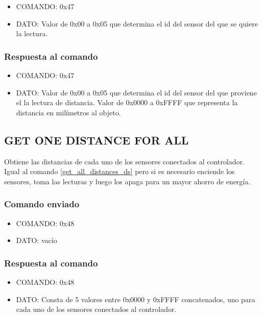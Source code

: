 \documentclass[a4paper,10pt]{article}
\begin{document}
\begin{itemize}
	\item{COMANDO:} 0x47
	\item{DATO:} Valor de 0x00 a 0x05 que determina el id del sensor del que se quiere la lectura.
\end{itemize}

\subsubsection*{Respuesta al comando}

\begin{itemize}
	\item{COMANDO:} 0x47
	\item{DATO:} Valor de 0x00 a 0x05 que determina el id del sensor del que proviene el la lectura de distancia.
	Valor de 0x0000 a 0xFFFF que representa la distancia en mil\'imetros al objeto.
\end{itemize}

\subsection{GET ONE DISTANCE FOR ALL}
\label{get_one_distance_for_all_ds}

Obtiene las distancias de cada uno de los sensores conectados al controlador.
Igual al comando \ref{get_all_distances_ds} pero si es necesario enciende los sensores, toma las lecturas y luego los apaga para un mayor ahorro de energ\'ia.

\subsubsection*{Comando enviado}

\begin{itemize}
	\item{COMANDO:} 0x48
	\item{DATO:} vac\'io
\end{itemize}

\subsubsection*{Respuesta al comando}

\begin{itemize}
	\item{COMANDO:} 0x48
	\item{DATO:} Consta de 5 valores entre 0x0000 y 0xFFFF concatenados, uno para cada uno de los sensores conectados al controlador.
\end{itemize}
\end{document}
